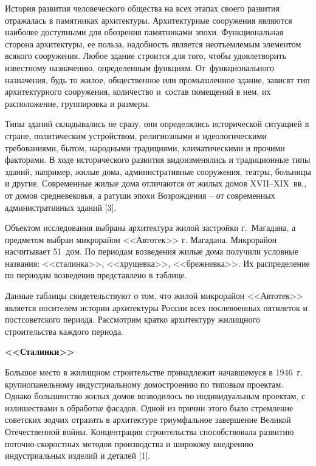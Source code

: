 



\makeProcTitle
{}

История развития человеческого общества на всех этапах своего развития отражалась в памятниках архитектуры. Архитектурные сооружения являются наиболее доступными для обозрения памятниками эпохи. Функциональная сторона архитектуры, ее польза, надобность является неотъемлемым элементом всякого сооружения. Любое здание строится для того, чтобы удовлетворить известному назначению, определенным функциям. От~функционального назначения, будь то жилое, общественное или промышленное здание, зависят тип архитектурного сооружения, количество и~состав помещений в нем, их расположение, группировка и размеры.

Типы зданий складывались не сразу, они определялись исторической ситуацией в стране, политическим устройством, религиозными и идеологическими требованиями, бытом, народными традициями, климатическими и прочими факторами. В ходе исторического развития видоизменялись и традиционные типы зданий, например, жилые дома, административные сооружения, театры, больницы и другие. Современные жилые дома отличаются от жилых домов XVII--XIX~вв., от домов средневековья, а ратуши эпохи Возрождения – от современных административных зданий [3].

Объектом исследования выбрана архитектура жилой застройки г.~Магадана, а предметом выбран микрорайон <<Автотек>> г. Магадана. Микрорайон насчитывает 51~дом. По периодам возведения жилые дома получили условные названия: <<сталинка>>, <<хрущевка>>, <<брежневка>>. Их распределение по периодам возведения представлено в таблице.



Данные таблицы свидетельствуют о том, что жилой микрорайон <<Автотек>> является носителем истории архитектуры России всех послевоенных пятилеток и постсоветского периода. Рассмотрим кратко архитектуру жилищного строительства каждого периода.

\textbf{<<Сталинки>>}

Большое место в жилищном строительстве принадлежит начавшемуся в 1946~г. крупнопанельному индустриальному домостроению по типовым проектам. Однако большинство жилых домов возводилось по индивидуальным проектам, с излишествами в обработке фасадов. Одной из причин этого было стремление советских зодчих отразить в архитектуре триумфальное завершение Великой Отечественной войны. Концентрация строительства способствовала развитию поточно-скоростных методов производства и широкому внедрению индустриальных изделий и деталей [1].

